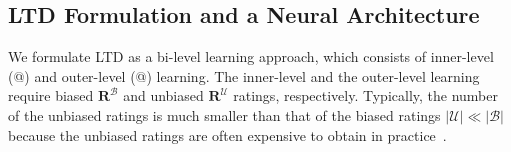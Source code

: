 \documentclass[letterpaper]{article} %
\makeatletter
\newcommand{\matrixize}[1]{\mathbf{#1}}
\newcommand{\obsBiasedPairs}{\mathcal{B}}
\newcommand{\obsUnbiasedPairs}{\mathcal{U}}
\newcommand{\trueRatings}{\matrixize{R}}
\newcommand*{\myroman}[1]{\expandafter\@slowromancap\romannumeral #1@}
\makeatother
\begin{document}
\subsection{LTD Formulation and a Neural Architecture}
\label{sec:ltd formulation}

We formulate LTD as a bi-level learning approach, which consists of inner-level (\myroman{1}) and outer-level (\myroman{2}) learning.
The inner-level and the outer-level learning require biased $\trueRatings^\obsBiasedPairs$ and unbiased $\trueRatings^\obsUnbiasedPairs$ ratings, respectively.
Typically, the number of the unbiased ratings is much smaller than that of the biased ratings $|\obsUnbiasedPairs|\ll|\obsBiasedPairs|$ because the unbiased ratings are often expensive to obtain in practice~\cite{marlin2007collaborative}.
\end{document}
